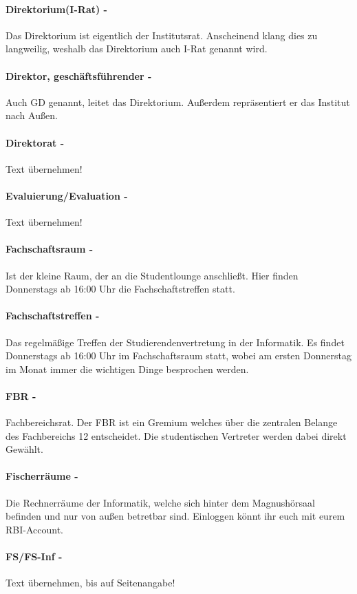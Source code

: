 \documentclass[12pt,a4paper]{article}
\begin{document}
	\paragraph{Direktorium(I-Rat) -} Das Direktorium ist eigentlich der Institutsrat. Anscheinend klang dies zu langweilig, weshalb das Direktorium auch I-Rat genannt wird.
	\paragraph{Direktor, geschäftsführender -} Auch GD genannt, leitet das Direktorium. Außerdem repräsentiert er das Institut nach Außen.
	\paragraph{Direktorat -} Text übernehmen!
	\paragraph{Evaluierung/Evaluation -} Text übernehmen!
	\paragraph{Fachschaftsraum -} Ist der kleine Raum, der an die Studentlounge anschließt. Hier finden Donnerstags ab 16:00 Uhr die Fachschaftstreffen statt.
	\paragraph{Fachschaftstreffen -} Das regelmäßige Treffen der Studierendenvertretung in der Informatik. Es findet Donnerstags ab 16:00 Uhr im Fachschaftsraum statt, wobei am ersten Donnerstag im Monat immer die wichtigen Dinge besprochen werden.
	\paragraph{FBR -} \glqq Fachbereichsrat\grqq. Der FBR ist ein Gremium welches über die zentralen Belange des Fachbereichs 12 entscheidet. Die studentischen Vertreter werden dabei direkt Gewählt.
	\paragraph{Fischerräume -} Die Rechnerräume der Informatik, welche sich hinter dem Magnushörsaal befinden und nur von außen  betretbar sind. Einloggen könnt ihr euch mit eurem RBI-Account.
	\paragraph{FS/FS-Inf -} Text übernehmen, bis auf Seitenangabe!
\end{document}
